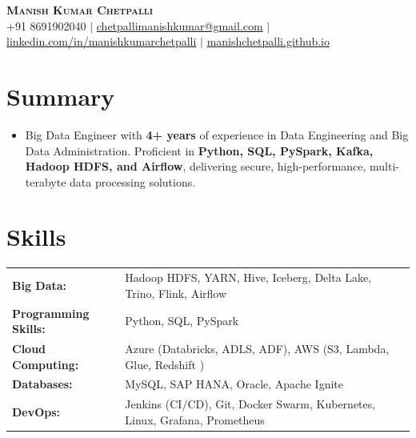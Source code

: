 \documentclass[letterpaper,11pt]{article}
\begin{document}
\begin{center}
  \textbf{\Huge \scshape Manish Kumar Chetpalli} \\ \vspace{4pt}
  \small +91 8691902040 $|$ \href{mailto:chetpallimanishkumar@gmail.com}{chetpallimanishkumar@gmail.com} $|$
  \href{https://www.linkedin.com/in/manishkumarchetpalli}{linkedin.com/in/manishkumarchetpalli} $|$
      \href{https://github.com/manishchetpalli}{manishchetpalli.github.io} 
\end{center}

\section{Summary}
\begin{itemize}[leftmargin=0.15in, label={}]
  \item{Big Data Engineer with \textbf{4+ years} of experience in Data Engineering and Big Data Administration. Proficient in \textbf{Python, SQL, PySpark, Kafka, Hadoop HDFS, and Airflow}, delivering secure, high-performance, multi-terabyte data processing solutions.}
\end{itemize}


\section{Skills}

\begin{tabular}{ l l }
\textbf{Big Data: } & Hadoop HDFS, YARN, Hive, Iceberg, Delta Lake, Trino, Flink, Airflow \\
\textbf{Programming Skills: } & Python, SQL, PySpark \\
\textbf{Cloud Computing: } & Azure (Databricks, ADLS, ADF), AWS (S3, Lambda, Glue, Redshift ) \\
\textbf{Databases: } & MySQL, SAP HANA, Oracle, Apache Ignite \\
\textbf{DevOps: } & Jenkins (CI/CD), Git, Docker Swarm, Kubernetes, Linux, Grafana, Prometheus \\
\end{tabular}

\end{document}
